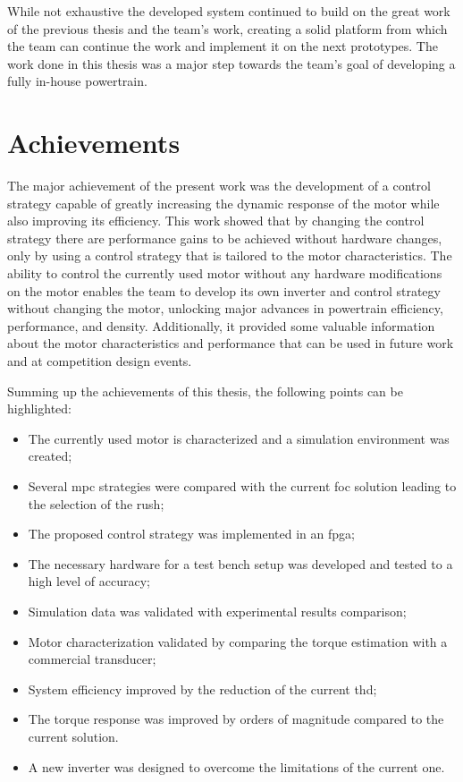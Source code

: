 While not exhaustive the developed system continued to build on the great work of the previous thesis and the team's work, creating a solid platform from which the team can continue the work and implement it on the next prototypes. The work done in this thesis was a major step towards the team's goal of developing a fully in-house powertrain.
\section{Achievements}
\label{section:achievements}

The major achievement of the present work was the development of a control strategy capable of greatly increasing the dynamic response of the motor while also improving its efficiency. This work showed that by changing the control strategy there are performance gains to be achieved without hardware changes, only by using a control strategy that is tailored to the motor characteristics. The ability to control the currently used motor without any hardware modifications on the motor enables the team to develop its own inverter and control strategy without changing the motor, unlocking major advances in powertrain efficiency, performance, and density. Additionally, it provided some valuable information about the motor characteristics and performance that can be used in future work and at competition design events.

Summing up the achievements of this thesis, the following points can be highlighted:
\begin{itemize}
    \item The currently used motor is characterized and a simulation environment was created;
    \item Several \gls{mpc} strategies were compared with the current \gls{foc} solution leading to the selection of the \gls{rush};
    \item The proposed control strategy was implemented in an \gls{fpga};
    \item The necessary hardware for a test bench setup was developed and tested to a high level of accuracy;
    \item Simulation data was validated with experimental results comparison;
    \item Motor characterization validated by comparing the torque estimation with a commercial transducer;
    \item System efficiency improved by the reduction of the current \gls{thd};
    \item The torque response was improved by orders of magnitude compared to the current solution.
    \item A new inverter was designed to overcome the limitations of the current one.
\end{itemize}


